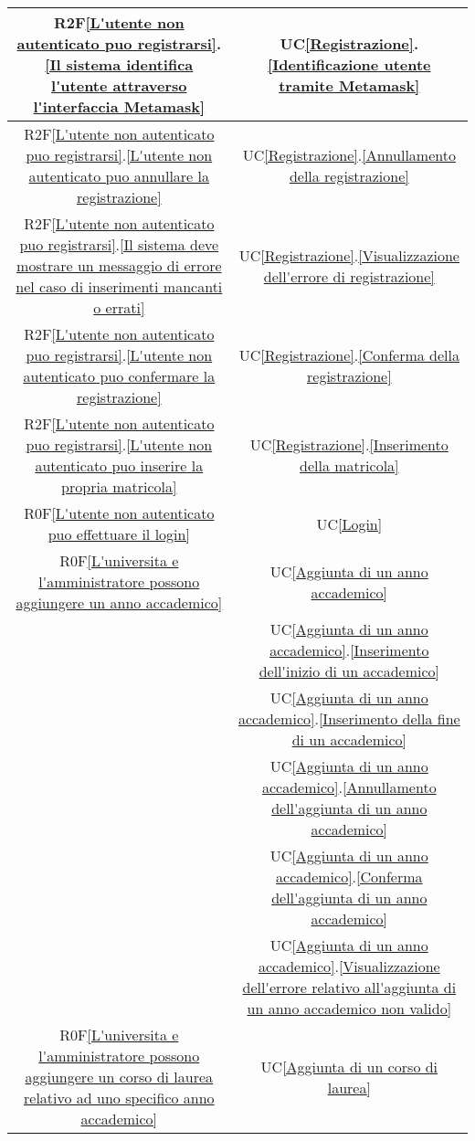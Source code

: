 \begin{longtable}{|c|c|}
\hline
R2F\ref{L'utente non autenticato puo registrarsi}.\ref{Il sistema identifica l'utente attraverso l'interfaccia Metamask} & UC\ref{Registrazione}.\ref{Identificazione utente tramite Metamask}\\
\hline
R2F\ref{L'utente non autenticato puo registrarsi}.\ref{L'utente non autenticato puo annullare la registrazione} & UC\ref{Registrazione}.\ref{Annullamento della registrazione}\\
\hline
R2F\ref{L'utente non autenticato puo registrarsi}.\ref{Il sistema deve mostrare un messaggio di errore nel caso di inserimenti mancanti o errati} & UC\ref{Registrazione}.\ref{Visualizzazione dell'errore di registrazione}\\
\hline
R2F\ref{L'utente non autenticato puo registrarsi}.\ref{L'utente non autenticato puo confermare la registrazione} & UC\ref{Registrazione}.\ref{Conferma della registrazione}\\
\hline
R2F\ref{L'utente non autenticato puo registrarsi}.\ref{L'utente non autenticato puo inserire la propria matricola} & UC\ref{Registrazione}.\ref{Inserimento della matricola}\\
\hline
R0F\ref{L'utente non autenticato puo effettuare il login} & UC\ref{Login}\\
\hline
R0F\ref{L'universita e l'amministratore possono aggiungere un anno accademico} & UC\ref{Aggiunta di un anno accademico}\\
& UC\ref{Aggiunta di un anno accademico}.\ref{Inserimento dell'inizio di un accademico}\\
& UC\ref{Aggiunta di un anno accademico}.\ref{Inserimento della fine di un accademico}\\
& UC\ref{Aggiunta di un anno accademico}.\ref{Annullamento dell'aggiunta di un anno accademico}\\
& UC\ref{Aggiunta di un anno accademico}.\ref{Conferma dell'aggiunta di un anno accademico}\\
& UC\ref{Aggiunta di un anno accademico}.\ref{Visualizzazione dell'errore relativo all'aggiunta di un anno accademico non valido}\\
\hline
R0F\ref{L'universita e l'amministratore possono aggiungere un corso di laurea relativo ad uno specifico anno accademico} & UC\ref{Aggiunta di un corso di laurea}\\

\end{longtable}
